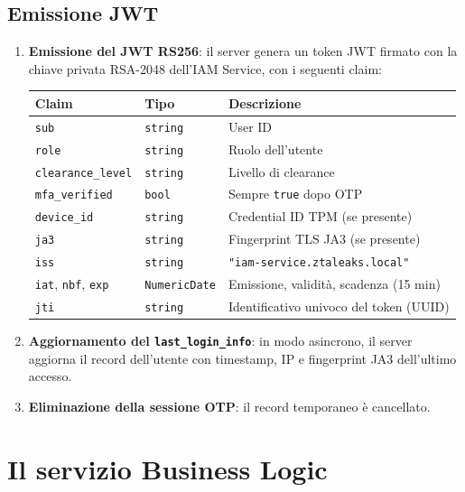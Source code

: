 \subsection{Emissione JWT}
\label{sec:jwt}
\begin{enumerate}
    \item \textbf{Emissione del JWT RS256}: il server genera un token
    JWT firmato con la chiave privata RSA-2048 dell'IAM Service,
    con i seguenti claim:

    \begin{center}
    \begin{tabular}{@{}lll@{}}
    \toprule
    \textbf{Claim} & \textbf{Tipo} & \textbf{Descrizione} \\
    \midrule
    \texttt{sub}             & \texttt{string} & User ID \\
    \texttt{role}            & \texttt{string} & Ruolo dell'utente \\
    \texttt{clearance\_level} & \texttt{string} & Livello di clearance \\
    \texttt{mfa\_verified}   & \texttt{bool}   & Sempre \texttt{true} dopo OTP \\
    \texttt{device\_id}      & \texttt{string} & Credential ID TPM (se presente) \\
    \texttt{ja3}             & \texttt{string} & Fingerprint TLS JA3 (se presente) \\
    \texttt{iss}             & \texttt{string} & \texttt{"iam-service.ztaleaks.local"} \\
    \texttt{iat}, \texttt{nbf}, \texttt{exp} & \texttt{NumericDate} & Emissione, validità, scadenza (15 min) \\
    \texttt{jti}             & \texttt{string} & Identificativo univoco del token (UUID) \\
    \bottomrule
    \end{tabular}
    \end{center}

  \item \textbf{Aggiornamento del \texttt{last\_login\_info}}: in modo
    asincrono, il server aggiorna il record dell'utente con timestamp,
    IP e fingerprint JA3 dell'ultimo accesso.

  \item \textbf{Eliminazione della sessione OTP}: il record temporaneo
    è cancellato.
\end{enumerate}

\section{Il servizio Business Logic}

